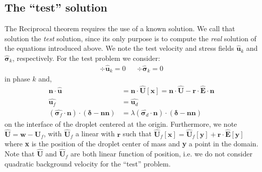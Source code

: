 \subsection{The ``test'' solution}

The Reciprocal theorem requires the use of a known solution.
We call that solution the \textit{test} solution, since its only purpose is to compute the \textit{real} solution of the equations introduced above. 
We note the test velocity and stress fields $\hat{\textbf{u}}_k$ and $\hat{\bm\sigma}_k$, respectively. 
For the test problem we consider:
\begin{align}
    \div \hat{\textbf{u}}_k = 0 
    && \div \hat{\bm\sigma}_k = 0 
    \label{eq:test_sol}
\end{align}
in phase $k$ and, 
\begin{align}    
    \textbf{n}\cdot \hat{\textbf{u}} &=  \textbf{n}\cdot \hat{\textbf{U}}[\textbf{x}] = \textbf{n}\cdot \hat{\textbf{U}} - \textbf{r}\cdot \hat{\textbf{E}} \cdot \textbf{n}\\
    \hat{\textbf{u}_f} &= \hat{\textbf{u}_d}\\
    (\hat{\bm\sigma_f}\cdot \textbf{n}) \cdot (\bm\delta - \textbf{nn})
    &= 
    \lambda (\hat{\bm\sigma_d}\cdot \textbf{n}) \cdot (\bm\delta - \textbf{nn}) \label{eq:bc_stress}
\end{align} 
on the interface of the droplet centered at the origin. 
Furthermore, we note $\hat{\textbf{U}} = \textbf{w} - \hat{\textbf{U}}_f$, with $\hat{\textbf{U}}_f$ a linear with $\textbf{r}$ such that $ \hat{\textbf{U}}_f[\textbf{x}] = \hat{\textbf{U}}_f[\textbf{y}]+\textbf{r}\cdot \hat{\textbf{E}}[\textbf{y}]$  where \textbf{x} is the position of the droplet center of mass and \textbf{y} a point in the domain.
Note that $\hat{\textbf{U}}$ and $\hat{\textbf{U}}_f$ are both linear function of position, i.e. we do not consider quadratic background velocity for the ``test''  problem. 

